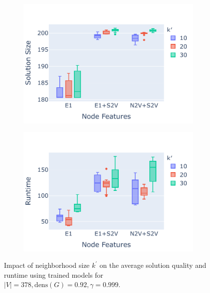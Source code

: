 \documentclass[draft,final]{vutinfth} %
\begin{document}
\begin{figure}
    \centering
    \begin{subfigure}{0.49\textwidth}
        \centering
        \includegraphics[width=\textwidth]{graphics/neighborhood-size.pdf}
    \end{subfigure}
    \begin{subfigure}{0.49\textwidth}
        \centering
        \includegraphics[width=\textwidth]{graphics/neighborhood-runtime.pdf}
    \end{subfigure}
    \caption{Impact of neighborhood size $k^\prime$ on the average solution quality and runtime using trained models for $|V|=378, \mathrm{dens}(G)=0.92, \gamma=0.999$.}
    \label{fig:neighborhood-size}
\end{figure}
\end{document}
